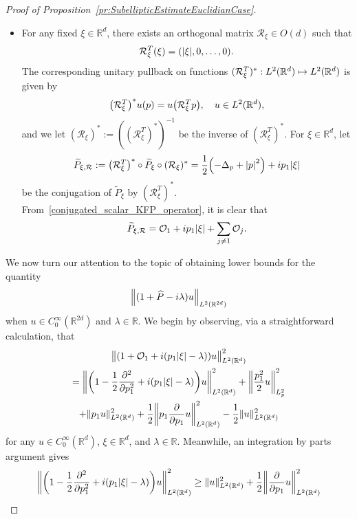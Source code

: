 \documentclass[10pt]{amsart}
\theoremstyle{definition}\newtheorem{defi}[theo]{Definition}\newtheorem{rema}[theo]{Remark}\newtheorem{exam}[theo]{Example}\newtheorem{exem}[theo]{Example}\newtheorem{nota}[theo]{Notation}
\newcommand{\R}{\mathbb{R}}
\newcommand{\clO}{\mathcal{O}}
\newcommand{\clR}{\mathcal{R}}
\newcommand{\p}{\partial}
\newcommand{\abs}[1]{\left| #1 \right|}
\newcommand\norm[1]{\left\lVert#1\right\rVert}
\let\oldhat\hat
\renewcommand*{\hat}[1]{\mathchoice{\widehat{#1}}{\widehat{#1}}{\oldhat{#1}}{\oldhat{#1}}}
\let\originalleft\left
\let\originalright\right
\renewcommand{\left}{\mathopen{}\mathclose\bgroup\originalleft}
\renewcommand{\right}{\aftergroup\egroup\originalright}
\let\oldmapsto\mapsto
\renewcommand*{\mapsto}{\mathchoice{\longmapsto}{\oldmapsto}{\oldmapsto}{\oldmapsto}}
\begin{document}
\begin{proof}[{Proof of Proposition~\ref{pr:SubellipticEstimateEuclidianCase}}]
\begin{itemize}
\item For any fixed $\xi \in \R^d$, there exists an orthogonal matrix $\clR_\xi \in O(d)$ such that
\begin{equation}\label{definition_of_R_xi}
\clR^T_\xi(\xi) = \left(\abs{\xi}, 0, \dots, 0 \right).
\end{equation}
The corresponding unitary pullback on functions $(\clR^T_\xi)^*: L^2(\R^d) \mapsto L^2(\R^d)$ is given by
\begin{align*}
\left(\clR^T_\xi\right)^* u(p) = u\left(\clR^T_\xi p\right), \quad  u \in L^2(\R^d),
\end{align*}
and we let $(\clR_\xi)^* := ((\clR^T_\xi )^*)^{-1}$ be the inverse of $(\clR^T_\xi)^*$. For $\xi \in \R^d$, let
\begin{equation}\label{conjugated_scalar_KFP_operator}
\widetilde{P}_{\xi, \clR} := \left(\clR^T_\xi\right)^* \circ \widetilde{P}_\xi \circ (\clR_\xi)^* = \frac{1}{2} \left(-\Delta_p + \abs{p}^2 \right) + ip_1 \abs{\xi}
\end{equation}
be the conjugation of $\widetilde{P}_\xi$ by $(\clR^T_\xi)^*$. From~\eqref{conjugated_scalar_KFP_operator}, it is clear that
\begin{equation}
\widetilde{P}_{\xi, \clR} = \clO_1 + ip_1 \abs{\xi} + \sum_{j \neq 1} \clO_j.
\end{equation}
\end{itemize}
We now turn our attention to the topic of obtaining lower bounds for the quantity
\begin{equation}
\norm{(1+\hat{P}-i\lambda)u}_{L^2(\R^{2d})}
\end{equation}
when $u \in C^\infty_0(\R^{2d})$ and $\lambda \in \R$. We begin by observing, via a straightforward calculation, that
\begin{multline}\label{eq:ExpansionInNormOfThe1DHatP}
\bigl\| (1+\clO_1+i(p_1 |\xi| -\lambda))u \bigr\|_{L^2(\R^d)}^{2}\\
=
\left\|
\left(1-\frac{1}{2}\frac{\p^2}{\p p_1^2}+i(p_{1}|\xi|-\lambda)\right)u
\right\|_{L^2(\R^d)}^{2} +
\left\|
\frac{p_{1}^{2}}{2} u
\right\|_{L^2_p}^{2}
\\
+ \| p_{1}u\|_{L^2(\R^d)}^{2} +
\frac{1}{2}\left\| p_{1} \frac{\partial}{\partial p_{1}}u
\right\|_{L^2(\R^d)}^{2} - \frac{1}{2}\|u\|_{L^2(\R^d)}^2
\end{multline}
for any $u \in C^\infty_0(\R^d)$, $\xi \in \R^d$, and $\lambda \in \R$. Meanwhile, an integration by parts argument gives
\begin{equation}\label{eq:InequalityIpp1D}
\left\|\left(1-\frac{1}{2} \frac{\p^2}{\p p^2_1}+i(p_{1}|\xi|-\lambda)\right) u \right\|^{2}_{L^2(\R^d)} \geq \|u\|^{2}_{L^2(\R^d)} +\frac{1}{2} \left\| \frac{\partial}{\partial p_{1}}u\right\|^{2}_{L^2(\R^d)}

\end{equation}
\end{proof}
\end{document}
